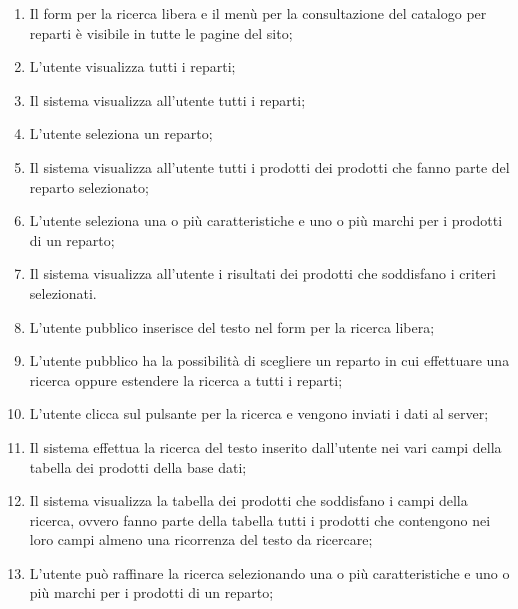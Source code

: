 \begin{enumerate}
	
	\item
	Il form per la ricerca libera e il menù per la consultazione del catalogo per reparti è visibile in tutte le pagine del sito;
	
	\item
	L'utente visualizza tutti i reparti;
	
	\item
	Il sistema visualizza all'utente tutti i reparti;
	
	\item
	L'utente seleziona un reparto;
	
	\item
	Il sistema visualizza all'utente tutti i prodotti dei prodotti che fanno parte del reparto selezionato;
	
	\item
	L'utente seleziona una o più caratteristiche e uno o più marchi per i prodotti di un reparto;
	
	\item
	Il sistema visualizza all'utente i risultati dei prodotti che soddisfano i criteri selezionati.
	
	\item
	L'utente pubblico inserisce del testo nel form per la ricerca libera;
	
	\item
	L'utente pubblico ha la possibilità di scegliere un reparto in cui effettuare una ricerca oppure estendere la ricerca a tutti i reparti;
	
	\item
	L'utente clicca sul pulsante per la ricerca e vengono inviati i dati al server;
	
	\item
	Il sistema effettua la ricerca del testo inserito dall'utente nei vari campi della tabella dei prodotti della base dati;
	
	\item
	Il sistema visualizza la tabella dei prodotti che soddisfano i campi della ricerca, ovvero fanno parte della tabella tutti i prodotti che contengono nei loro campi almeno una ricorrenza del testo da ricercare; 
	
	\item
	L'utente può raffinare la ricerca selezionando una o più caratteristiche e uno o più marchi per i prodotti di un reparto;
	
\end{enumerate}

